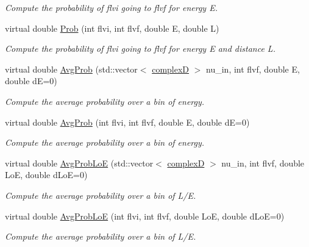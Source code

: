 \begin{DoxyCompactItemize}
\begin{DoxyCompactList}\small\item\em Compute the probability of flvi going to flvf for energy E. \end{DoxyCompactList}\item 
virtual double \hyperlink{classOscProb_1_1PMNS__Base_a6e0a74508d9d6db7be02e242b8467563}{Prob} (int flvi, int flvf, double E, double L)
\begin{DoxyCompactList}\small\item\em Compute the probability of flvi going to flvf for energy E and distance L. \end{DoxyCompactList}\item 
virtual double \hyperlink{classOscProb_1_1PMNS__Base_a32ccdf67b4f31da952a7e254f8629509}{Avg\+Prob} (std\+::vector$<$ \hyperlink{EigenPoint_8h_a67ca8e107e20610c3fff78d5e726ece0}{complexD} $>$ nu\+\_\+in, int flvf, double E, double dE=0)
\begin{DoxyCompactList}\small\item\em Compute the average probability over a bin of energy. \end{DoxyCompactList}\item 
virtual double \hyperlink{classOscProb_1_1PMNS__Base_ac03f754160422e6600da8dbae0f803ed}{Avg\+Prob} (int flvi, int flvf, double E, double dE=0)
\begin{DoxyCompactList}\small\item\em Compute the average probability over a bin of energy. \end{DoxyCompactList}\item 
virtual double \hyperlink{classOscProb_1_1PMNS__Base_a30d0b056f592acba53cf9ed07430800c}{Avg\+Prob\+LoE} (std\+::vector$<$ \hyperlink{EigenPoint_8h_a67ca8e107e20610c3fff78d5e726ece0}{complexD} $>$ nu\+\_\+in, int flvf, double LoE, double d\+LoE=0)
\begin{DoxyCompactList}\small\item\em Compute the average probability over a bin of L/E. \end{DoxyCompactList}\item 
virtual double \hyperlink{classOscProb_1_1PMNS__Base_ac19a92f4ef428a7333ca8eed76fca637}{Avg\+Prob\+LoE} (int flvi, int flvf, double LoE, double d\+LoE=0)
\begin{DoxyCompactList}\small\item\em Compute the average probability over a bin of L/E. \end{DoxyCompactList}\item 

\end{DoxyCompactItemize}
